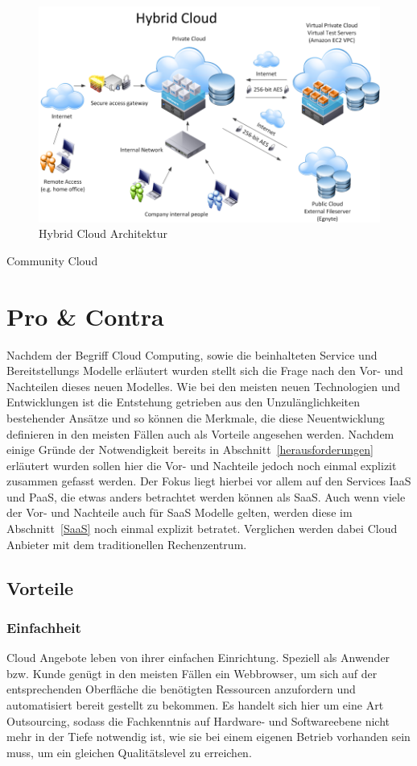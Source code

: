 	\begin{figure}[h]
		\centering
		\includegraphics[width=0.9\linewidth]{images/hybrid-cloud-architektur}
		\caption{Hybrid Cloud Architektur}
		\label{fig:HybridCloud}
	\end{figure}


Community Cloud\\

\section{Pro \& Contra}
Nachdem der Begriff Cloud Computing, sowie die beinhalteten Service und Bereitstellungs Modelle erläutert wurden stellt sich die Frage nach den Vor- und Nachteilen dieses neuen Modelles. Wie bei den meisten neuen Technologien und Entwicklungen ist die Entstehung getrieben aus den Unzulänglichkeiten bestehender Ansätze und so können die Merkmale, die diese Neuentwicklung definieren in den meisten Fällen auch als Vorteile angesehen werden. Nachdem einige Gründe der Notwendigkeit bereits in Abschnitt~\ref{herausforderungen} erläutert wurden sollen hier die Vor- und Nachteile jedoch noch einmal explizit zusammen gefasst werden. Der Fokus liegt hierbei vor allem auf den Services IaaS und PaaS, die etwas anders betrachtet werden können als SaaS. Auch wenn viele der Vor- und Nachteile auch für SaaS Modelle gelten, werden diese im Abschnitt~\ref{SaaS} noch einmal explizit betratet. Verglichen werden dabei Cloud Anbieter mit dem traditionellen Rechenzentrum.

\subsection{Vorteile}

\subsubsection{Einfachheit}\label{einfachheit}
Cloud Angebote leben von ihrer einfachen Einrichtung. Speziell als Anwender bzw. Kunde genügt in den meisten Fällen ein Webbrowser, um sich auf der entsprechenden Oberfläche die benötigten Ressourcen anzufordern und automatisiert bereit gestellt zu bekommen. Es handelt sich hier um eine Art Outsourcing, sodass die Fachkenntnis auf Hardware- und Softwareebene nicht mehr in der Tiefe notwendig ist, wie sie bei einem eigenen Betrieb vorhanden sein muss, um ein gleichen Qualitätslevel zu erreichen.
